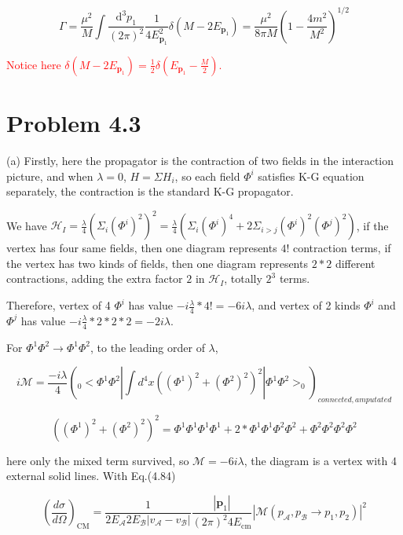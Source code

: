 \documentclass[11pt]{article} %
\begin{document}
\[
    \Gamma=\frac{\mu^{2}}{M} \int \frac{\mathrm{d}^{3} p_{1}}{(2 \pi)^{2}} \frac{1}{4 E_{\mathbf{p}_{1}}^{2}} \delta\left(M-2 E_{\mathbf{p}_{1}}\right)=\frac{\mu^{2}}{8 \pi M}\left(1-\frac{4 m^{2}}{M^{2}}\right)^{1 / 2}    
\]

\textcolor{red}{Notice here $\delta(M - 2 E_{\mathbf{p}_1}) = \frac{1}{2} \delta(E_{\mathbf{p}_1} - \frac{M}{2})$.}

\section{Problem 4.3}

\noindent (a)
Firstly, here the propagator is the contraction of two fields in the interaction picture, and when $\lambda = 0$, $H = \Sigma H_i$, so each field $\Phi^i$ satisfies K-G equation separately, the contraction is the standard K-G propagator.

We have $\mathcal{H}_I = \frac{\lambda}{4} (\Sigma_i (\Phi^i)^2 )^2 = \frac{\lambda}{4} ( \Sigma_i (\Phi^i)^4 + 2 \Sigma_{i > j} (\Phi^i)^2 (\Phi^j)^2 )$, if the vertex has four same fields, then one diagram represents $4!$ contraction terms, if the vertex has two kinds of fields, then one diagram represents $2*2$ different contractions, adding the extra factor $2$ in $\mathcal{H}_I$, totally $2^3$ terms.

Therefore, vertex of 4 $\Phi^i$ has value $-i \frac{\lambda}{4} * 4! = -6 i \lambda$, and vertex of 2 kinds $\Phi^i$ and $\Phi^j$ has value $-i \frac{\lambda}{4} * 2*2 * 2 = -2 i \lambda$.

For $\Phi^1 \Phi^2 \to \Phi^1 \Phi^2$, to the leading order of $\lambda$,

\[
    i \mathcal{M} = \frac{-i \lambda}{4} ( _0<\Phi^1 \Phi^2|\int d^4 x ( (\Phi^1)^2 + (\Phi^2)^2 )^2|\Phi^1 \Phi^2>_0 )_{connected, amputated}    
\]

\[
    ( (\Phi^1)^2 + (\Phi^2)^2 )^2 = \Phi^1 \Phi^1 \Phi^1 \Phi^1 + 2*\Phi^1 \Phi^1 \Phi^2 \Phi^2 + \Phi^2 \Phi^2 \Phi^2 \Phi^2       
\]

here only the mixed term survived, so $\mathcal{M} = -6 i \lambda$, the diagram is a vertex with 4 external solid lines. With Eq.(4.84)

\[
    \left(\frac{d \sigma}{d \Omega}\right)_{\mathrm{CM}}=\frac{1}{2 E_{\mathcal{A}} 2 E_{\mathcal{B}}\left|v_{\mathcal{A}}-v_{\mathcal{B}}\right|} \frac{\left|\mathbf{p}_{1}\right|}{(2 \pi)^{2} 4 E_{\mathrm{cm}}}\left|\mathcal{M}\left(p_{\mathcal{A}}, p_{\mathcal{B}} \rightarrow p_{1}, p_{2}\right)\right|^{2}    
\]
\end{document}
